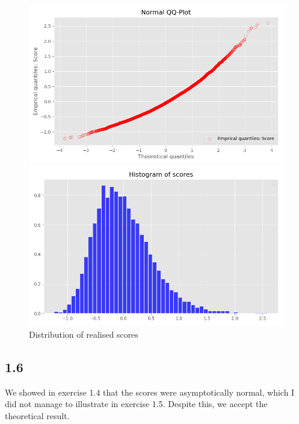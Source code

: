 \documentclass[11pt,a4paper,oneside]{article}
\begin{document}
\begin{figure}[ht]
\centering
\captionsetup{justification=centering,margin=0.6cm}
\caption{Distribution of realised scores}
\begin{minipage}[b]{0.45\linewidth}
\includegraphics[scale = 0.45]{images/qq_score.png}
\end{minipage}
\hspace{0.5cm}
\begin{minipage}[b]{0.45\linewidth}
\centering
\includegraphics[scale = 0.45]{images/hist_scores.png}
\end{minipage}
\begingroup
{}
\endgroup
\end{figure}

\subsection{1.6}
We showed in exercise 1.4 that the scores were asymptotically normal, which I did not manage to illustrate in exercise 1.5. Despite this, we accept the theoretical result.
\end{document}
